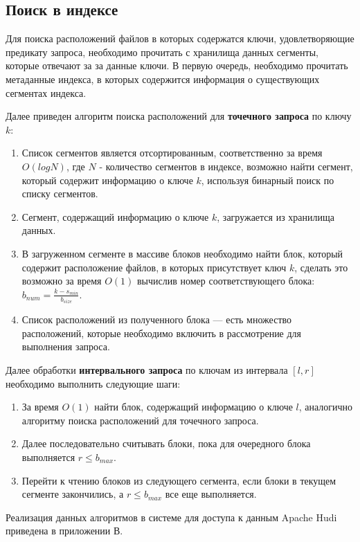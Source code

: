 \subsection{Поиск в индексе}

Для поиска расположений файлов  в которых содержатся ключи, удовлетворяющие предикату запроса, необходимо прочитать с хранилища данных сегменты, которые отвечают за за данные ключи. В первую очередь, необходимо прочитать метаданные индекса, в которых содержится информация о существующих сегментах индекса.

Далее приведен алгоритм поиска расположений для \textbf{точечного запроса} по ключу $k$:

\begin{enumerate}
    \item Список сегментов является отсортированным, соответственно за время $O(logN)$, где $N$ - количество сегментов в индексе, возможно найти сегмент, который содержит информацию о ключе $k$, используя бинарный поиск по списку сегментов.
    \item Сегмент, содержащий информацию о ключе $k$, загружается из хранилища данных.
    \item В загруженном сегменте в массиве блоков необходимо найти блок, который содержит расположение файлов, в которых присутствует ключ $k$, сделать это возможно за время $O(1)$ вычислив номер соответствующего блока: $b_{num} = \frac{k - s_{min}}{b_{size}}$.
    \item Список расположений из полученного блока --- есть множество расположений, которые необходимо включить в рассмотрение для выполнения запроса.
\end{enumerate}

Далее обработки \textbf{интервального запроса} по ключам из интервала $[l, r]$ необходимо выполнить следующие шаги:

\begin{enumerate}
    \item За время $O(1)$ найти блок, содержащий информацию о ключе $l$, аналогично алгоритму поиска расположений для точечного запроса.
    \item Далее последовательно считывать блоки, пока для очередного блока выполняется $r \leq b_{max}$.
    \item Перейти к чтению блоков из следующего сегмента, если блоки в текущем сегменте закончились, а $r \leq b_{max}$ все еще выполняется. 
\end{enumerate}

Реализация данных алгоритмов в системе для доступа к данным Apache Hudi приведена в приложении В.
